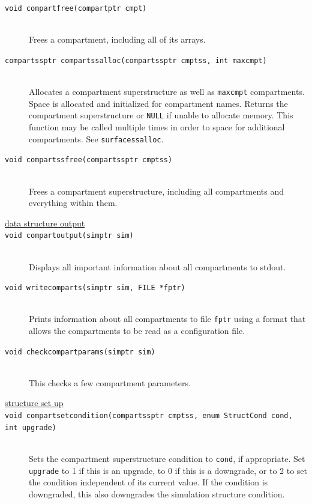 \documentclass {scrbook}
\newcommand {\ttt} {\texttt}
\begin{document}
\begin{description}
\item[\ttt{void compartfree(compartptr cmpt)}]
\hfill \\
Frees a compartment, including all of its arrays.

\item[\ttt{compartssptr compartssalloc(compartssptr cmptss, int maxcmpt)}]
\hfill \\
Allocates a compartment superstructure as well as \ttt{maxcmpt} compartments. Space is allocated and initialized for compartment names. Returns the compartment superstructure or \ttt{NULL} if unable to allocate memory. This function may be called multiple times in order to space for additional compartments. See \ttt{surfacessalloc}.

\item[\ttt{void compartssfree(compartssptr cmptss)}]
\hfill \\
Frees a compartment superstructure, including all compartments and everything within them.

\item[\underline{data structure output}]

\item[\ttt{void compartoutput(simptr sim)}]
\hfill \\
Displays all important information about all compartments to stdout.

\item[\ttt{void writecomparts(simptr sim, FILE *fptr)}]
\hfill \\
Prints information about all compartments to file \ttt{fptr} using a format that allows the compartments to be read as a configuration file.

\item[\ttt{void checkcompartparams(simptr sim)}]
\hfill \\
This checks a few compartment parameters.

\item[\underline{structure set up}]

\item[\ttt{void compartsetcondition(compartssptr cmptss, enum StructCond cond, int upgrade)}]
\hfill \\
Sets the compartment superstructure condition to \ttt{cond}, if appropriate. Set \ttt{upgrade} to 1 if this is an upgrade, to 0 if this is a downgrade, or to 2 to set the condition independent of its current value. If the condition is downgraded, this also downgrades the simulation structure condition.


\end{description}
\end{document}
